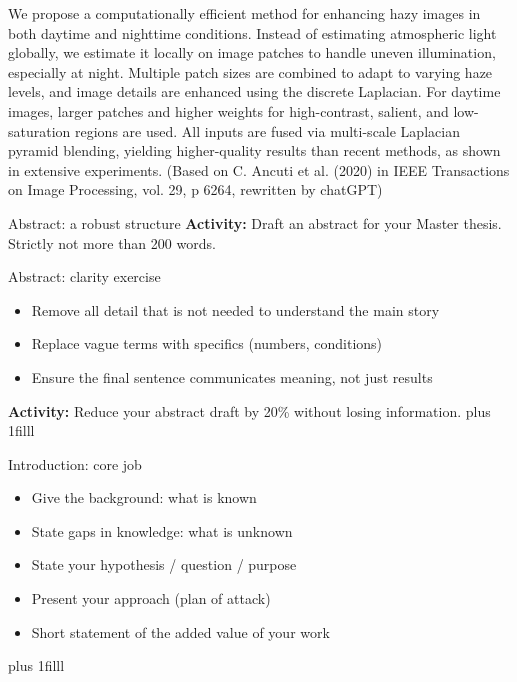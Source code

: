 \documentclass[aspectratio=169]{beamer}
\newcommand{\btVFill}{\vskip0pt plus 1filll}
\newcommand{\Activity}[1]{\textbf{Activity:} #1}
\begin{document}
\begin{frame}
\small{We propose a computationally efficient method for enhancing hazy images in both daytime and nighttime conditions. Instead of estimating atmospheric light globally, we estimate it locally on image patches to handle uneven illumination, especially at night. Multiple patch sizes are combined to adapt to varying haze levels, and image details are enhanced using the discrete Laplacian. For daytime images, larger patches and higher weights for high-contrast, salient, and low-saturation regions are used. All inputs are fused via multi-scale Laplacian pyramid blending, yielding higher-quality results than recent methods, as shown in extensive experiments. (Based on C. Ancuti et al. (2020) in IEEE Transactions on Image Processing, vol. 29, p 6264, rewritten by chatGPT)}
\end{frame}


\begin{frame}{Abstract: a robust structure}
\Activity{Draft an abstract for your Master thesis. Strictly not more than 200 words.}
\end{frame}

\begin{frame}{Abstract: clarity exercise}
  \begin{itemize}
    \item Remove all detail that is not needed to understand the main story
    \item Replace vague terms with specifics (numbers, conditions)
    \item Ensure the final sentence communicates meaning, not just results
  \end{itemize}
  \bigskip
  \Activity{Reduce your abstract draft by 20\% without losing information.}
  \btVFill
\end{frame}

\begin{frame}{Introduction: core job}
  \begin{itemize}
    \item Give the background: what is known
    \item State gaps in knowledge: what is unknown
    \item State your hypothesis / question / purpose
    \item Present your approach (plan of attack)
    \item Short statement of the added value of your work
  \end{itemize}
  \btVFill
\end{frame}
\end{document}
